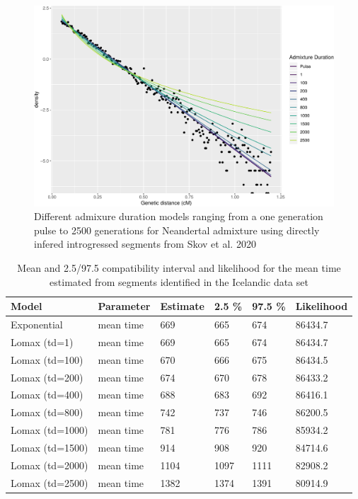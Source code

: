 \documentclass[]{article}
\begin{document}
\begin{figure}
\centering
\includegraphics{Admixture_Time_Inference_Paper_Draft_files/figure-latex/figS5-1.pdf}
\caption{\label{fig:figS5} Different admixure duration models ranging
from a one generation pulse to 2500 generations for Neandertal admixture
using directly infered introgressed segments from Skov et al. 2020}
\end{figure}

\begin{table}[H]
\caption{\label{tab:tableS3}\label{tab:tableS3} Mean and 2.5/97.5 compatibility interval and likelihood for the mean time  estimated from segments identified in the Icelandic data set }

\centering
\begin{tabular}{l|l|l|l|l|l}
\hline
Model & Parameter & Estimate & 2.5 \% & 97.5 \% & Likelihood\\
\hline
Exponential & mean time & 669 & 665 & 674 & 86434.7\\
\hline
Lomax (td=1) & mean time & 669 & 665 & 674 & 86434.7\\
\hline
Lomax (td=100) & mean time & 670 & 666 & 675 & 86434.5\\
\hline
Lomax (td=200) & mean time & 674 & 670 & 678 & 86433.2\\
\hline
Lomax (td=400) & mean time & 688 & 683 & 692 & 86416.1\\
\hline
Lomax (td=800) & mean time & 742 & 737 & 746 & 86200.5\\
\hline
Lomax (td=1000) & mean time & 781 & 776 & 786 & 85934.2\\
\hline
Lomax (td=1500) & mean time & 914 & 908 & 920 & 84714.6\\
\hline
Lomax (td=2000) & mean time & 1104 & 1097 & 1111 & 82908.2\\
\hline
Lomax (td=2500) & mean time & 1382 & 1374 & 1391 & 80914.9\\
\hline
\end{tabular}
\end{table}
\end{document}
